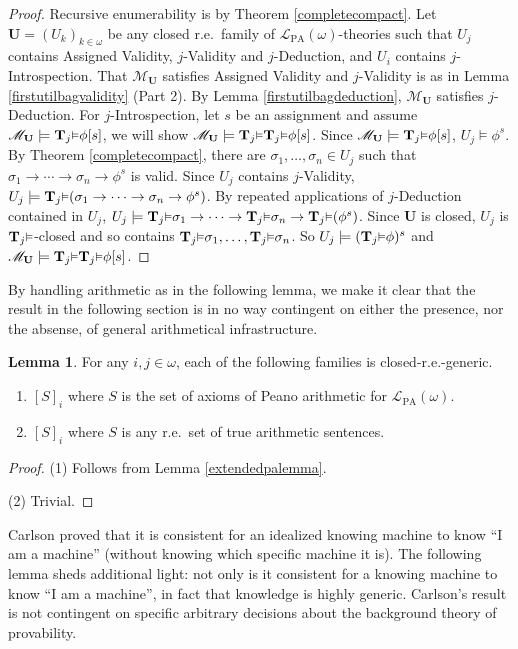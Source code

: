\documentclass[reqno]{article}
\theoremstyle{definition}
\newtheorem{lemma}[theorem]{Lemma}
\def\L{\mathscr{L}}
\def\M{\mathscr{M}}
\def\T{\mathbf{T}}
\def\U{\mathbf{U}}
\def\LPA{\L_{\mathrm{PA}}}
\renewcommand{\Pr}[1]{\T_{#1}\mbox{\small${\vDash}$}}
\begin{document}
\begin{proof}
Recursive enumerability is by Theorem \ref{completecompact}.
Let $\U=(U_k)_{k\in\omega}$ be any closed r.e.~family
of $\LPA(\omega)$-theories such that $U_j$ contains Assigned Validity, $j$-Validity and $j$-Deduction,
and $U_i$ contains $j$-Introspection.
That $\M_{\U}$ satisfies Assigned Validity and $j$-Validity is as in
Lemma \ref{firstutilbagvalidity} (Part 2).
By Lemma \ref{firstutilbagdeduction},
$\M_{\U}$ satisfies $j$-Deduction.
For $j$-Introspection, let $s$ be an assignment and assume
$\M_{\U}\models \Pr j\phi[s]$, we will show $\M_{\U}\models\Pr j\Pr j\phi[s]$.
Since $\M_{\U}\models \Pr j\phi[s]$, $U_j\models\phi^s$.
By Theorem \ref{completecompact}, there are $\sigma_1,\ldots,\sigma_n\in U_j$
such that $\sigma_1\rightarrow\cdots\rightarrow\sigma_n\rightarrow\phi^s$
is valid.
Since $U_j$ contains $j$-Validity,
$U_j\models \Pr j(\sigma_1\rightarrow\cdots\rightarrow\sigma_n\rightarrow\phi^s)$.
By repeated applications of $j$-Deduction contained in $U_j$,
$U_j\models \Pr j\sigma_1\rightarrow\cdots\rightarrow\Pr j\sigma_n\rightarrow \Pr j(\phi^s)$.
Since $\U$ is closed, $U_j$ is $\Pr j$-closed and
so contains $\Pr j\sigma_1,\ldots,\Pr j\sigma_n$.
So $U_j\models (\Pr j\phi)^s$ and $\M_{\U}\models \Pr j\Pr j\phi[s]$.
\end{proof}

By handling arithmetic as in the following lemma, we make it clear that
the result in the following section is in no way contingent on either the
presence, nor the absense, of general arithmetical infrastructure.

\begin{lemma}
\label{firstutilbagarithmetic}
For any $i,j\in\omega$, each of the following families is closed-r.e.-generic.
\begin{enumerate}
\item $[S]_i$ where $S$ is the set of axioms of Peano arithmetic for $\LPA(\omega)$.
\item $[S]_i$ where $S$ is any r.e.~set of true arithmetic sentences.
\end{enumerate}
\end{lemma}

\begin{proof}
\item (1) Follows from Lemma \ref{extendedpalemma}.

\item (2) Trivial.
\end{proof}

Carlson proved \cite{carlson2000} that it is consistent for an idealized
knowing machine to know
``I am a machine'' (without knowing which specific machine it is).
The following lemma sheds additional light: not only is it consistent for a
knowing machine to know ``I am a machine'', in fact that knowledge is
highly generic. Carlson's result is not contingent on specific arbitrary
decisions about the background theory of provability.
\end{document}
